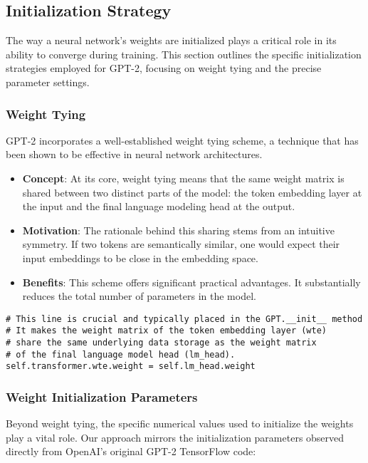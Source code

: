 \subsection{Initialization Strategy}
The way a neural network's weights are initialized plays a critical role in its ability to converge during training. This section outlines the specific initialization strategies employed for GPT-2, focusing on weight tying and the precise parameter settings.

\subsubsection{Weight Tying}
GPT-2 incorporates a well-established weight tying scheme, a technique that has been shown to be effective in neural network architectures.

\begin{itemize}
    \item \textbf{Concept}: At its core, weight tying means that the same weight matrix is shared between two distinct parts of the model: the token embedding layer at the input and the final language modeling head at the output.
    \item \textbf{Motivation}: The rationale behind this sharing stems from an intuitive symmetry. If two tokens are semantically similar, one would expect their input embeddings to be close in the embedding space.
    \item \textbf{Benefits}: This scheme offers significant practical advantages. It substantially reduces the total number of parameters in the model.
\end{itemize}

\begin{lstlisting}[caption={Weight Tying Implementation}]
# This line is crucial and typically placed in the GPT.__init__ method
# It makes the weight matrix of the token embedding layer (wte)
# share the same underlying data storage as the weight matrix
# of the final language model head (lm_head).
self.transformer.wte.weight = self.lm_head.weight
\end{lstlisting}

\subsubsection{Weight Initialization Parameters}
Beyond weight tying, the specific numerical values used to initialize the weights play a vital role. Our approach mirrors the initialization parameters observed directly from OpenAI's original GPT-2 TensorFlow code:

